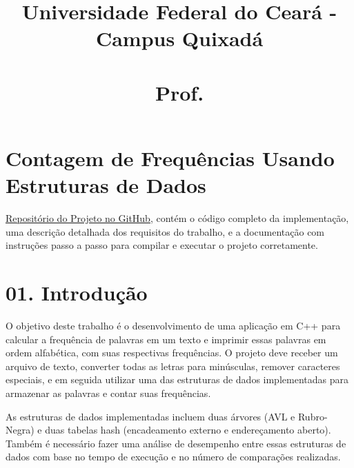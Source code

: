 \documentclass{article}
\title{Universidade Federal do Ceará - Campus Quixadá \\ \disciplina \\ Prof. \professor}
\author{\autor}
\date{\data}
\newcommand{\trabalhoTitulo}{\textbf{Contagem de Frequências Usando Estruturas de Dados}}
\begin{document}
\maketitle

\section*{\trabalhoTitulo}

\href{https://github.com/auanK/Dictionary}
{\underline{Repositório do Projeto no GitHub}}, contém o código completo da implementação, uma descrição detalhada dos requisitos do trabalho, e a documentação com instruções passo a passo para compilar e executar o projeto corretamente.

\section*{01. Introdução}

O objetivo deste trabalho é o desenvolvimento de uma aplicação em C++ para calcular a frequência de palavras em um texto e imprimir essas palavras em ordem alfabética, com suas respectivas frequências. O projeto deve receber um arquivo de texto, converter todas as letras para minúsculas, remover caracteres especiais, e em seguida utilizar uma das estruturas de dados implementadas para armazenar as palavras e contar suas frequências.

As estruturas de dados implementadas incluem duas árvores (AVL e Rubro-Negra) e duas tabelas hash (encadeamento externo e endereçamento aberto). Também é necessário fazer uma análise de desempenho entre essas estruturas de dados com base no tempo de execução e no número de comparações realizadas.
\end{document}
